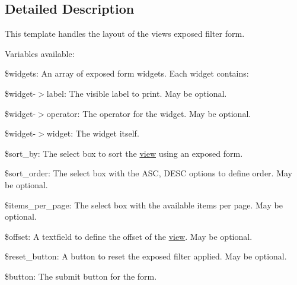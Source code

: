 \subsection{Detailed Description}
This template handles the layout of the views exposed filter form.

Variables available:
\begin{DoxyItemize}
\item \$widgets: An array of exposed form widgets. Each widget contains:
\item \$widget-\/$>$label: The visible label to print. May be optional.
\item \$widget-\/$>$operator: The operator for the widget. May be optional.
\item \$widget-\/$>$widget: The widget itself.
\item \$sort\_\-by: The select box to sort the \hyperlink{classview}{view} using an exposed form.
\item \$sort\_\-order: The select box with the ASC, DESC options to define order. May be optional.
\item \$items\_\-per\_\-page: The select box with the available items per page. May be optional.
\item \$offset: A textfield to define the offset of the \hyperlink{classview}{view}. May be optional.
\item \$reset\_\-button: A button to reset the exposed filter applied. May be optional.
\item \$button: The submit button for the form. 
\end{DoxyItemize}